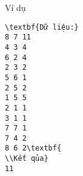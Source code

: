 Ví dụ
\begin{verbatim}
\textbf{Dữ liệu:} 
8 7 11
4 3 4
6 2 4
2 3 2
5 6 1
2 5 2
1 5 5
2 1 1
3 1 1
7 7 1
7 4 2
8 6 2\textbf{
\\Kết qủa} 
11
\end{verbatim}